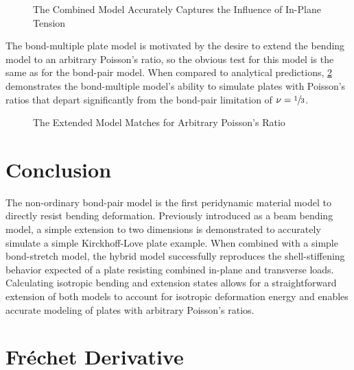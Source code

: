 \documentclass[preprint,review,12pt]{elsarticle}
\newcommand{\plotpath}{./plots}
\begin{document}
\begin{figure}[tbp]
  \centering
  \resizebox{0.55\linewidth}{!}{}
  \caption{The Combined Model Accurately Captures the Influence of In-Plane Tension}
  \label{fig:plateStiffening}
\end{figure}

The bond-multiple plate model is motivated by the desire to extend the bending model to an arbitrary Poisson's ratio, so the obvious test for this model is the same as for the bond-pair model. When compared to analytical predictions, \cref{fig:plate_poisson} demonstrates the bond-multiple model's ability to simulate plates with Poisson's ratios that depart significantly from the bond-pair limitation of $\nu = \sfrac{1}{3}$.

\begin{figure}[tbp]
  \centering
  \resizebox{0.55\linewidth}{!}{}
  \caption{The Extended Model Matches for Arbitrary Poisson's Ratio}
  \label{fig:plate_poisson}
\end{figure}


\section{Conclusion}

The non-ordinary bond-pair model is the first peridynamic material model to directly resist bending deformation.
Previously introduced as a beam bending model, a simple extension to two dimensions is demonstrated to accurately simulate a simple Kirckhoff-Love plate example.
When combined with a simple bond-stretch model, the hybrid model successfully reproduces the shell-stiffening behavior expected of a plate resisting combined in-plane and transverse loads.
Calculating isotropic bending and extension states allows for a straightforward extension of both models to account for isotropic deformation energy and enables accurate modeling of plates with arbitrary Poisson's ratios.


\appendix
\section{Fr\'echet Derivative}
\label{sec:frechet}
\end{document}
